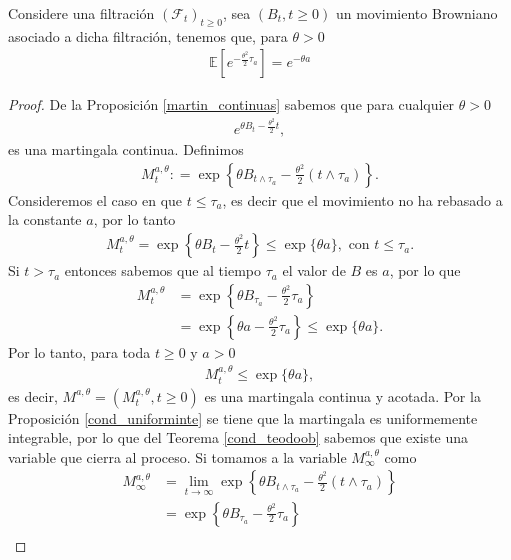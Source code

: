 \begin{proposition}
Considere una filtración $(\mathcal{F}_t)_{t \geq 0}$, sea $(B_t, t \geq 0)$ un movimiento Browniano asociado a dicha filtración, tenemos que, para $\theta > 0$
\begin{align*}
\mathbb{E} \left[ e^{- \frac{\theta^2}{2} \tau_a} \right] = e^{- \theta a}
\end{align*}
\end{proposition}
\begin{proof}
De la Proposición \ref{martin_continuas} sabemos que para cualquier $\theta > 0$
\begin{align*}
e^{\theta B_t - \frac{\theta^2}{2} t},
\end{align*}
es una martingala continua. Definimos 
\begin{align*}
M_t^{a, \theta} : = \exp \left\{ \theta B_{t \wedge \tau_{a}} -  \frac{\theta^2}{2} (t \wedge \tau_a) \right\}.
\end{align*}
Consideremos el caso en que $t \leq \tau_a$, es decir que el movimiento no ha rebasado a la constante $a$, por lo tanto
\begin{align*}
M_t^{a, \theta} = \exp \left\{ \theta B_{t} -  \frac{\theta^2}{2} t \right\} \leq \exp \{ \theta a \}, \text{ con } t \leq \tau_a.
\end{align*}
Si $t > \tau_a$ entonces sabemos que al tiempo $\tau_a$ el valor de $B$ es $a$, por lo que
\begin{align*}
M_t^{a, \theta} & = \exp \left\{ \theta B_{\tau_a} - \frac{\theta^2}{2} \tau_a \right\} \\
& = \exp \left\{ \theta a - \frac{\theta^2}{2} \tau_a \right\} \leq \exp \{ \theta a \}.
\end{align*}
Por lo tanto, para toda $t \geq 0$ y $a > 0$
\begin{align*}
M_t^{a, \theta} \leq \exp \{ \theta a \},
\end{align*}
es decir, $M^{a, \theta} = (M^{a, \theta}_t, t \geq 0)$ es una martingala continua y acotada. Por la Proposición \ref{cond_uniforminte} se tiene que la martingala es uniformemente integrable, por lo que del Teorema \ref{cond_teodoob} sabemos que existe una variable que cierra al proceso. Si tomamos a la variable $M^{a, \theta}_{\infty}$ como
\begin{align*}
M^{a, \theta}_{\infty} & = \lim_{t \rightarrow \infty} \exp \left\{ \theta B_{t \wedge \tau_a} - \frac{\theta^2}{2}(t \wedge \tau_a) \right\} \\
& = \exp \left\{ \theta B_{\tau_a} - \frac{\theta^2}{2} \tau_a \right\} \\

\end{align*}
\end{proof}
